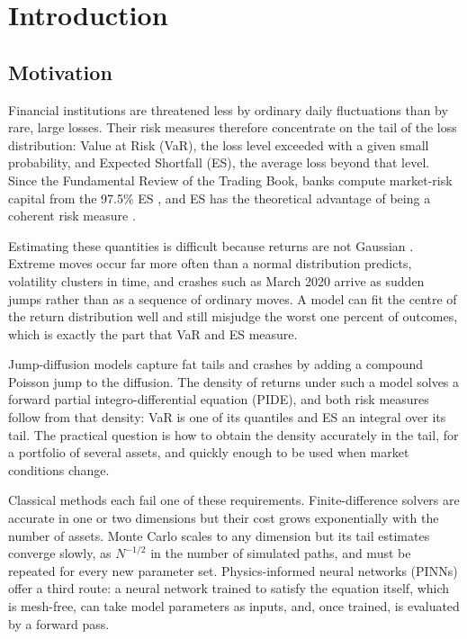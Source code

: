 \chapter{Introduction}
\label{ch:introduction}

\section{Motivation}
Financial institutions are threatened less by ordinary daily fluctuations than by rare, large losses. Their
risk measures therefore concentrate on the tail of the loss distribution: Value at Risk (VaR), the loss level
exceeded with a given small probability, and Expected Shortfall (ES), the average loss beyond that level. Since
the Fundamental Review of the Trading Book, banks compute market-risk capital from the 97.5\% ES
\citep{bcbs2019}, and ES has the theoretical advantage of being a coherent risk measure
\citep{artzner1999,acerbi2002}.

Estimating these quantities is difficult because returns are not Gaussian \citep{mandelbrot1963,cont2001}.
Extreme moves occur far more often than a normal distribution predicts, volatility clusters in time, and
crashes such as March 2020 arrive as sudden jumps rather than as a sequence of ordinary moves. A model can fit
the centre of the return distribution well and still misjudge the worst one percent of outcomes, which is
exactly the part that VaR and ES measure.

Jump-diffusion models \citep{merton1976,kou2002} capture fat tails and crashes by adding a compound Poisson
jump to the diffusion. The density of returns under such a model solves a forward partial
integro-differential equation (PIDE), and both risk measures follow from that density: VaR is one of its
quantiles and ES an integral over its tail. The practical question is how to obtain the density accurately in
the tail, for a portfolio of several assets, and quickly enough to be used when market conditions change.

Classical methods each fail one of these requirements. Finite-difference solvers are accurate in one or two
dimensions but their cost grows exponentially with the number of assets. Monte Carlo scales to any dimension but
its tail estimates converge slowly, as $N^{-1/2}$ in the number of simulated paths, and must be repeated for every
new parameter set. Physics-informed neural networks (PINNs) \citep{raissi2019} offer a third route: a neural
network trained to satisfy the equation itself, which is mesh-free, can take model parameters as inputs, and,
once trained, is evaluated by a forward pass.

